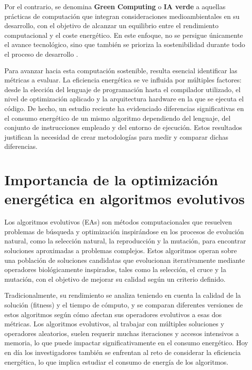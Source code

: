 Por el contrario, se denomina \textbf{Green Computing} o \textbf{IA verde} a aquellas prácticas de computación que integran consideraciones medioambientales en su desarrollo, con el objetivo de alcanzar un equilibrio entre el rendimiento computacional y el coste energético. En este enfoque, no se persigue únicamente el avance tecnológico, sino que también se prioriza la sostenibilidad durante todo el proceso de desarrollo \cite{zhou2023opportunities}. 

Para avanzar hacia esta computación sostenible, resulta esencial identificar las métricas a evaluar. La eficiencia energética se ve influida por múltiples factores: desde la elección del lenguaje de programación hasta el compilador utilizado, el nivel de optimización aplicado y la arquitectura hardware en la que se ejecuta el código. De hecho, un estudio reciente ha evidenciado diferencias significativas en el consumo energético de un mismo algoritmo dependiendo del lenguaje, del conjunto de instrucciones empleado y del entorno de ejecución. Estos resultados justifican la necesidad de crear metodologías para medir y comparar dichas diferencias. \cite{lutz2021energy}

\section{Importancia de la optimización energética en algoritmos evolutivos}

Los algoritmos evolutivos (EAs) son métodos computacionales que resuelven problemas de búsqueda y optimización inspirándose en los procesos de evolución natural, como la selección natural, la reproducción y la mutación, para encontrar soluciones aproximadas a problemas complejos. Estos algoritmos operan sobre una población de soluciones candidatas que evolucionan iterativamente mediante operadores biológicamente inspirados, tales como la selección, el cruce y la mutación, con el objetivo de mejorar su calidad según un criterio definido.

Tradicionalmente, su rendimiento se analiza teniendo en cuenta la calidad de la solución (fitness) y el tiempo de cómputo, y se comparan diferentes versiones de estos algoritmos según cómo afectan sus operadores evolutivos a esas dos métricas. Los algoritmos evolutivos, al trabajar con múltiples soluciones y operadores aleatorios, suelen requerir muchas iteraciones y accesos intensivos a memoria, lo que puede impactar significativamente en el consumo energético. Hoy en día los investigadores también se enfrentan al reto de considerar la eficiencia energética, lo que implica estudiar el consumo de energía de los algoritmos.

